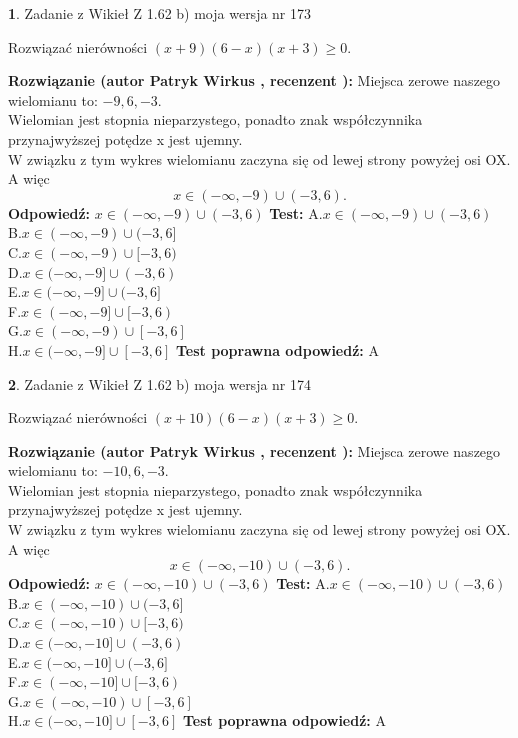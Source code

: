 \documentclass[12pt, a4paper]{article}
\theoremstyle{definition} %
\newtheorem{zad}{}
\newcommand{\zadStart}[1]{\begin{zad}#1\newline}
\newcommand{\zadStop}{\end{zad}}
\newcommand{\rozwStart}[2]{\noindent \textbf{Rozwiązanie (autor #1 , recenzent #2): }\newline}
\newcommand{\rozwStop}{\newline}
\newcommand{\odpStart}{\noindent \textbf{Odpowiedź:}\newline}
\newcommand{\odpStop}{\newline}
\newcommand{\testStart}{\noindent \textbf{Test:}\newline}
\newcommand{\testStop}{\newline}
\newcommand{\kluczStart}{\noindent \textbf{Test poprawna odpowiedź:}\newline}
\newcommand{\kluczStop}{\newline}
\begin{document}
\zadStart{Zadanie z Wikieł Z 1.62 b) moja wersja nr 173}

Rozwiązać nierówności $(x+9)(6-x)(x+3)\ge0$.
\zadStop
\rozwStart{Patryk Wirkus}{}
Miejsca zerowe naszego wielomianu to: $-9, 6, -3$.\\
Wielomian jest stopnia nieparzystego, ponadto znak współczynnika przy\linebreak najwyższej potędze x jest ujemny.\\ W związku z tym wykres wielomianu zaczyna się od lewej strony powyżej osi OX. A więc $$x \in (-\infty,-9) \cup (-3,6).$$
\rozwStop
\odpStart
$x \in (-\infty,-9) \cup (-3,6)$
\odpStop
\testStart
A.$x \in (-\infty,-9) \cup (-3,6)$\\
B.$x \in (-\infty,-9) \cup (-3,6]$\\
C.$x \in (-\infty,-9) \cup [-3,6)$\\
D.$x \in (-\infty,-9] \cup (-3,6)$\\
E.$x \in (-\infty,-9] \cup (-3,6]$\\
F.$x \in (-\infty,-9] \cup [-3,6)$\\
G.$x \in (-\infty,-9) \cup [-3,6]$\\
H.$x \in (-\infty,-9] \cup [-3,6]$
\testStop
\kluczStart
A
\kluczStop



\zadStart{Zadanie z Wikieł Z 1.62 b) moja wersja nr 174}

Rozwiązać nierówności $(x+10)(6-x)(x+3)\ge0$.
\zadStop
\rozwStart{Patryk Wirkus}{}
Miejsca zerowe naszego wielomianu to: $-10, 6, -3$.\\
Wielomian jest stopnia nieparzystego, ponadto znak współczynnika przy\linebreak najwyższej potędze x jest ujemny.\\ W związku z tym wykres wielomianu zaczyna się od lewej strony powyżej osi OX. A więc $$x \in (-\infty,-10) \cup (-3,6).$$
\rozwStop
\odpStart
$x \in (-\infty,-10) \cup (-3,6)$
\odpStop
\testStart
A.$x \in (-\infty,-10) \cup (-3,6)$\\
B.$x \in (-\infty,-10) \cup (-3,6]$\\
C.$x \in (-\infty,-10) \cup [-3,6)$\\
D.$x \in (-\infty,-10] \cup (-3,6)$\\
E.$x \in (-\infty,-10] \cup (-3,6]$\\
F.$x \in (-\infty,-10] \cup [-3,6)$\\
G.$x \in (-\infty,-10) \cup [-3,6]$\\
H.$x \in (-\infty,-10] \cup [-3,6]$
\testStop
\kluczStart
A
\kluczStop
\end{document}
